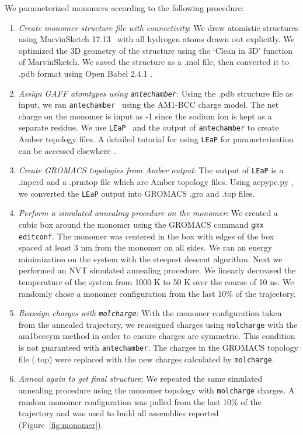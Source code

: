\documentclass{article}
\begin{document}
  We parameterized monomers according to the following procedure:
  \begin{enumerate}
  
	\item \textit{Create monomer structure file with connectivity}: We
	drew atomistic structures using MarvinSketch
	17.13~\cite{chemaxon_marvinsketch_2017} with all hydrogen atoms drawn out
	explicitly. We optimized the 3D geometry of the structure using the `Clean in
	3D' function of MarvinSketch.  We saved the structure as a .mol file, then
	converted it to .pdb format using Open Babel 2.4.1
	\cite{oboyle_open_2011,noauthor_open_nodate}. 
	
	\item \textit{Assign GAFF atomtypes using \texttt{antechamber}}: Using
	the .pdb structure file as input, we ran
	\texttt{antechamber}~\cite{wang_automatic_2006} using the AM1-BCC charge model.
	The net charge on the monomer is input as -1 since the sodium ion is kept as 
	a separate residue. We use \texttt{LEaP}~\cite{case_ambertools16_2016} and the
	output of \texttt{antechamber} to create Amber topology files. A detailed
	tutorial for using \texttt{LEaP} for parameterization can be accessed elsewhere \cite{walker_antechamber_nodate}.

	\item \textit{Create GROMACS topologies from Amber output}: The output
	of \texttt{LEaP} is a .inpcrd and a .prmtop file which are Amber topology
	files. Using acpype.py \cite{sousa_da_silva_acpype_2012}, we converted the
	\texttt{LEaP} output into GROMACS .gro and .top files. 

	\item \textit{Perform a simulated annealing procedure on the monomer}:
	We created a cubic box around the monomer using the GROMACS command \texttt{gmx
	editconf}. The monomer was centered in the box with edges of the
	box spaced at least 3 nm from the monomer on all sides. We ran an energy minimization
	on the system with the steepest descent algorithm. Next we performed an NVT
	simulated annealing procedure. We linearly decreased the temperature of the
	system from 1000 K to 50 K over the course of 10 ns. We randomly chose a monomer
	configuration from the last 10\% of the trajectory. 

	\item \textit{Reassign charges with \texttt{molcharge}}: With the monomer
	configuration taken from the annealed trajectory, we reassigned charges using
	\texttt{molcharge} with the am1bccsym method in order to ensure charges 
	are symmetric. This condition is not guaranteed with \texttt{antechamber}. 
	The charges in the GROMACS topology file (.top) were replaced with the 
	new charges calculated by \texttt{molcharge}. 

	\item \textit{Anneal again to get final structure}: We repeated the
	same simulated annealing procedure using the monomer topology with
	\texttt{molcharge} charges. A random monomer configuration was pulled from the
	last 10\% of the trajectory and was used to build all assemblies reported
	(Figure~\ref{fig:monomer}).
	
  \end{enumerate} 
\end{document}
